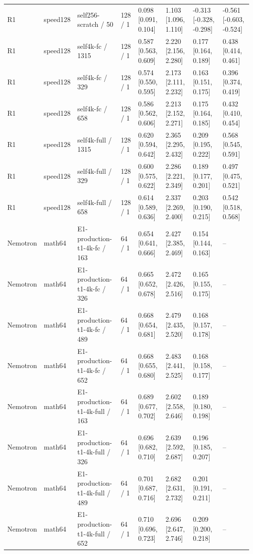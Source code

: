 \begin{tabular}{llllllll}
R1 & speed128 & self256-scratch / 50 & 128 / 1 & 0.098 [0.091, 0.104] & 1.103 [1.096, 1.110] & -0.313 [-0.328, -0.298] & -0.561 [-0.603, -0.524] \\
R1 & speed128 & self4k-fc / 1315 & 128 / 1 & 0.587 [0.563, 0.609] & 2.220 [2.156, 2.280] & 0.177 [0.164, 0.189] & 0.438 [0.414, 0.461] \\
R1 & speed128 & self4k-fc / 329 & 128 / 1 & 0.574 [0.550, 0.595] & 2.173 [2.111, 2.232] & 0.163 [0.151, 0.175] & 0.396 [0.374, 0.419] \\
R1 & speed128 & self4k-fc / 658 & 128 / 1 & 0.586 [0.562, 0.606] & 2.213 [2.152, 2.271] & 0.175 [0.164, 0.185] & 0.432 [0.410, 0.454] \\
R1 & speed128 & self4k-full / 1315 & 128 / 1 & 0.620 [0.594, 0.642] & 2.365 [2.295, 2.432] & 0.209 [0.195, 0.222] & 0.568 [0.545, 0.591] \\
R1 & speed128 & self4k-full / 329 & 128 / 1 & 0.600 [0.575, 0.622] & 2.286 [2.221, 2.349] & 0.189 [0.177, 0.201] & 0.497 [0.475, 0.521] \\
R1 & speed128 & self4k-full / 658 & 128 / 1 & 0.614 [0.589, 0.636] & 2.337 [2.269, 2.400] & 0.203 [0.190, 0.215] & 0.542 [0.518, 0.568] \\
Nemotron & math64 & E1-production-t1-4k-fc / 163 & 64 / 1 & 0.654 [0.641, 0.666] & 2.427 [2.385, 2.469] & 0.154 [0.144, 0.163] & -- \\
Nemotron & math64 & E1-production-t1-4k-fc / 326 & 64 / 1 & 0.665 [0.652, 0.678] & 2.472 [2.426, 2.516] & 0.165 [0.155, 0.175] & -- \\
Nemotron & math64 & E1-production-t1-4k-fc / 489 & 64 / 1 & 0.668 [0.654, 0.681] & 2.479 [2.435, 2.520] & 0.168 [0.157, 0.178] & -- \\
Nemotron & math64 & E1-production-t1-4k-fc / 652 & 64 / 1 & 0.668 [0.655, 0.680] & 2.483 [2.441, 2.525] & 0.168 [0.158, 0.177] & -- \\
Nemotron & math64 & E1-production-t1-4k-full / 163 & 64 / 1 & 0.689 [0.677, 0.702] & 2.602 [2.558, 2.646] & 0.189 [0.180, 0.198] & -- \\
Nemotron & math64 & E1-production-t1-4k-full / 326 & 64 / 1 & 0.696 [0.682, 0.710] & 2.639 [2.592, 2.687] & 0.196 [0.185, 0.207] & -- \\
Nemotron & math64 & E1-production-t1-4k-full / 489 & 64 / 1 & 0.701 [0.687, 0.716] & 2.682 [2.631, 2.732] & 0.201 [0.191, 0.211] & -- \\
Nemotron & math64 & E1-production-t1-4k-full / 652 & 64 / 1 & 0.710 [0.696, 0.723] & 2.696 [2.647, 2.746] & 0.209 [0.200, 0.218] & -- \\

\end{tabular}
